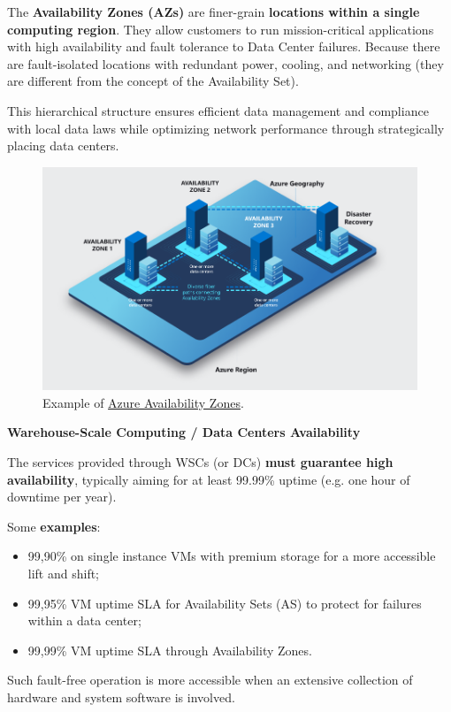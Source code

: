 \documentclass[a4paper]{article}
\newcommand{\definition}[1]{\textcolor{Red3}{\textbf{#1}}\index{#1}}
\newcommand{\example}[1]{\textcolor{Green4}{\textbf{#1}}}
\newcommand{\highspace}{\vspace{1.2em}\noindent}
\begin{document}
    \highspace
    The \definition{Availability Zones (AZs)} are finer-grain \textbf{locations within a single computing region}. They allow customers to run mission-critical applications with high availability and fault tolerance to Data Center failures. Because there are fault-isolated locations with redundant power, cooling, and networking (they are different from the concept of the Availability Set).

    \highspace
    This hierarchical structure ensures efficient data management and compliance with local data laws while optimizing network performance through strategically placing data centers.

    \begin{figure}[!htp]
        \centering
        \includegraphics[width=.8\textwidth]{img/availability-zones-region-geography.png}
        \caption{Example of \href{https://learn.microsoft.com/en-us/azure/reliability/availability-zones-overview?tabs=azure-cli}{Azure Availability Zones}.}
    \end{figure}

    \newpage

    \begin{center}
        \textcolor{Red2}{\textbf{Warehouse-Scale Computing / Data Centers Availability}}
    \end{center}

    The services provided through WSCs (or DCs) \textbf{must guarantee high availability}, typically aiming for at least 99.99\% uptime (e.g. one hour of downtime per year).

    \highspace
    Some \example{examples}:
    \begin{itemize}
        \item 99,90\% on single instance VMs with premium storage for a more accessible lift and shift;
        
        \item 99,95\% VM uptime SLA for Availability Sets (AS) to protect for failures within a data center;

        \item 99,99\% VM uptime SLA through Availability Zones.
    \end{itemize}
    Such fault-free operation is more accessible when an extensive collection of hardware and system software is involved.
    
\end{document}
